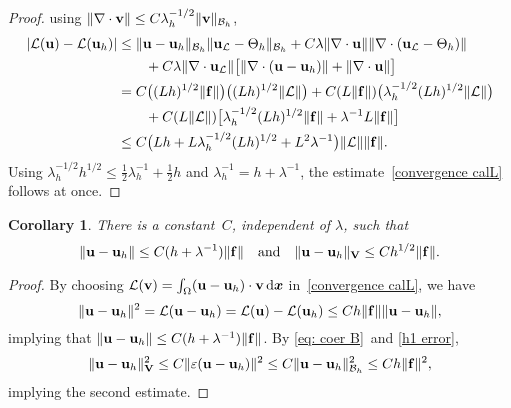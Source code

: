 \documentclass[11pt]{article}
\newcommand{\calB}{\mathcal{B}}
\newcommand{\calL}{\mathcal{L}}
\newcommand{\vf}{{\bf f}}
\newcommand{\vu}{{\bf u}}
\newcommand{\vv}{{\bf v}}
\newcommand{\vV}{{\bf V}}
\newcommand{\bsx}{{\boldsymbol{x}}}
\numberwithin{equation}{section}
\newcommand{\ud}{\mathrm{d}}
\newtheorem{corollary}[theorem]{Corollary}
\begin{document}
\begin{proof}
using $\|\nabla\cdot\vv\|\le C\lambda_h^{-1/2}\|\vv\|_{\calB_h}$,
\begin{align*}
|\calL(\vu)-\calL(\vu_h)|
    &\le\|\vu-\vu_h\|_{\calB_h}\|\vu_{\calL}-\Theta_h\|_{\calB_h}
    +C\lambda \|\nabla \cdot\vu\|\|\nabla\cdot(\vu_{\calL}-\Theta_h)\|\\
    &\qquad{}+C\lambda\|\nabla\cdot\vu_{\calL}\|
    \bigl[\|\nabla\cdot(\vu-\vu_h)\|+\|\nabla \cdot\vu\|\bigr]\\
    &=C\bigl((Lh)^{1/2}\|\vf\|\bigr)\bigl((Lh)^{1/2}\|\calL\|\bigr)
    +C(L\|\vf\|)\bigl(\lambda_h^{-1/2}(Lh)^{1/2}\|\calL\|\bigr)\\
    &\qquad{}+C(L\|\calL\|)\bigl[
    \lambda_h^{-1/2}(Lh)^{1/2}\|\vf\|+\lambda^{-1}L\|\vf\|\bigr]\\
    &\le C\bigr(Lh+L\lambda_h^{-1/2}(Lh)^{1/2}+L^2\lambda^{-1}\bigr)
        \|\calL\|\|\vf\|.
\end{align*}
Using $\lambda_h^{-1/2}h^{1/2}\le\frac12\lambda_h^{-1}+\tfrac12h$ and
$\lambda_h^{-1}=h+\lambda^{-1}$, the estimate~\eqref{convergence calL}
follows at once.
\end{proof}

\begin{corollary}\label{cor: L2 H1 errors}
There is a constant~$C$, independent of $\lambda$, such that
\[
\|\vu-\vu_h\|\le C(h+\lambda^{-1})\|\vf\|
\quad\text{and}\quad\|\vu-\vu_h\|_{\vV}\le Ch^{1/2}\|\vf\|.
\]
\end{corollary}
\begin{proof}
By choosing 
$\calL(\vv)=\int_\Omega(\vu-\vu_h)\cdot \vv\,\ud\bsx$ in~\eqref{convergence calL}, we have
\[
\|\vu-\vu_h\|^2=\calL(\vu-\vu_h)=\calL(\vu)-\calL(\vu_h)\le Ch\|\vf\|\|\vu-\vu_h\|,
\]
implying that $\|\vu-\vu_h\|\le C(h+\lambda^{-1})\|\vf\|$.  By
\eqref{eq: coer B}~and \eqref{h1 error},
\[
\|\vu-\vu_h\|_{\vV}^2\le C\|\varepsilon(\vu-\vu_h)\|^2
\le C\|\vu-\vu_h\|_{\calB_h}^2\le Ch\|\vf\|^2,
\]
implying the second estimate.
\end{proof}
\end{document}
